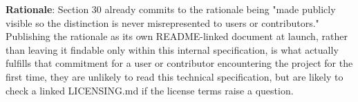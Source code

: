 \textbf{Rationale}: Section 30 already commits to the rationale being "made publicly visible so the distinction is never misrepresented to users or contributors." Publishing the rationale as its own README-linked document at launch, rather than leaving it findable only within this internal specification, is what actually fulfills that commitment for a user or contributor encountering the project for the first time, they are unlikely to read this technical specification, but are likely to check a linked \mbox{LICENSING.md} if the license terms raise a question.


\sentinelchapterend